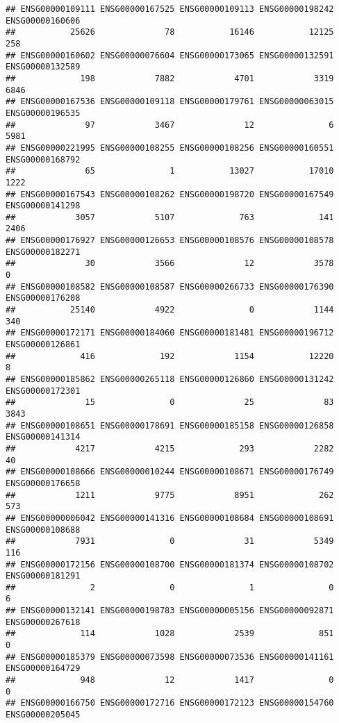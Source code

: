 \documentclass[
]{article}
\begin{document}
\begin{verbatim}
## ENSG00000109111 ENSG00000167525 ENSG00000109113 ENSG00000198242 ENSG00000160606 
##           25626              78           16146           12125             258 
## ENSG00000160602 ENSG00000076604 ENSG00000173065 ENSG00000132591 ENSG00000132589 
##             198            7882            4701            3319            6846 
## ENSG00000167536 ENSG00000109118 ENSG00000179761 ENSG00000063015 ENSG00000196535 
##              97            3467              12               6            5981 
## ENSG00000221995 ENSG00000108255 ENSG00000108256 ENSG00000160551 ENSG00000168792 
##              65               1           13027           17010            1222 
## ENSG00000167543 ENSG00000108262 ENSG00000198720 ENSG00000167549 ENSG00000141298 
##            3057            5107             763             141            2406 
## ENSG00000176927 ENSG00000126653 ENSG00000108576 ENSG00000108578 ENSG00000182271 
##              30            3566              12            3578               0 
## ENSG00000108582 ENSG00000108587 ENSG00000266733 ENSG00000176390 ENSG00000176208 
##           25140            4922               0            1144             340 
## ENSG00000172171 ENSG00000184060 ENSG00000181481 ENSG00000196712 ENSG00000126861 
##             416             192            1154           12220               8 
## ENSG00000185862 ENSG00000265118 ENSG00000126860 ENSG00000131242 ENSG00000172301 
##              15               0              25              83            3843 
## ENSG00000108651 ENSG00000178691 ENSG00000185158 ENSG00000126858 ENSG00000141314 
##            4217            4215             293            2282              40 
## ENSG00000108666 ENSG00000010244 ENSG00000108671 ENSG00000176749 ENSG00000176658 
##            1211            9775            8951             262             573 
## ENSG00000006042 ENSG00000141316 ENSG00000108684 ENSG00000108691 ENSG00000108688 
##            7931               0              31            5349             116 
## ENSG00000172156 ENSG00000108700 ENSG00000181374 ENSG00000108702 ENSG00000181291 
##               2               0               1               0               6 
## ENSG00000132141 ENSG00000198783 ENSG00000005156 ENSG00000092871 ENSG00000267618 
##             114            1028            2539             851               0 
## ENSG00000185379 ENSG00000073598 ENSG00000073536 ENSG00000141161 ENSG00000164729 
##             948              12            1417               0               0 
## ENSG00000166750 ENSG00000172716 ENSG00000172123 ENSG00000154760 ENSG00000205045 

\end{verbatim}
\end{document}
